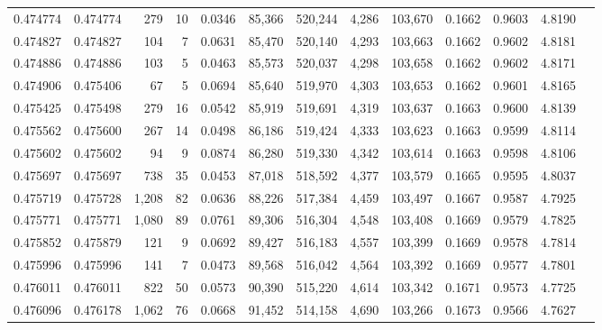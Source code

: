 \begin{tabular}{rrrrrrrrrrrrr}
0.474774 & 0.474774 &   279 &    10 &                                     0.0346 &  85,366 & 520,244 &   4,286 & 103,670 & 0.1662 & 0.9603 & 4.8190 \\
0.474827 & 0.474827 &   104 &     7 &                                     0.0631 &  85,470 & 520,140 &   4,293 & 103,663 & 0.1662 & 0.9602 & 4.8181 \\
0.474886 & 0.474886 &   103 &     5 &                                     0.0463 &  85,573 & 520,037 &   4,298 & 103,658 & 0.1662 & 0.9602 & 4.8171 \\
0.474906 & 0.475406 &    67 &     5 &                                     0.0694 &  85,640 & 519,970 &   4,303 & 103,653 & 0.1662 & 0.9601 & 4.8165 \\
0.475425 & 0.475498 &   279 &    16 &                                     0.0542 &  85,919 & 519,691 &   4,319 & 103,637 & 0.1663 & 0.9600 & 4.8139 \\
0.475562 & 0.475600 &   267 &    14 &                                     0.0498 &  86,186 & 519,424 &   4,333 & 103,623 & 0.1663 & 0.9599 & 4.8114 \\
0.475602 & 0.475602 &    94 &     9 &                                     0.0874 &  86,280 & 519,330 &   4,342 & 103,614 & 0.1663 & 0.9598 & 4.8106 \\
0.475697 & 0.475697 &   738 &    35 &                                     0.0453 &  87,018 & 518,592 &   4,377 & 103,579 & 0.1665 & 0.9595 & 4.8037 \\
0.475719 & 0.475728 & 1,208 &    82 &                                     0.0636 &  88,226 & 517,384 &   4,459 & 103,497 & 0.1667 & 0.9587 & 4.7925 \\
0.475771 & 0.475771 & 1,080 &    89 &                                     0.0761 &  89,306 & 516,304 &   4,548 & 103,408 & 0.1669 & 0.9579 & 4.7825 \\
0.475852 & 0.475879 &   121 &     9 &                                     0.0692 &  89,427 & 516,183 &   4,557 & 103,399 & 0.1669 & 0.9578 & 4.7814 \\
0.475996 & 0.475996 &   141 &     7 &                                     0.0473 &  89,568 & 516,042 &   4,564 & 103,392 & 0.1669 & 0.9577 & 4.7801 \\
0.476011 & 0.476011 &   822 &    50 &                                     0.0573 &  90,390 & 515,220 &   4,614 & 103,342 & 0.1671 & 0.9573 & 4.7725 \\
0.476096 & 0.476178 & 1,062 &    76 &                                     0.0668 &  91,452 & 514,158 &   4,690 & 103,266 & 0.1673 & 0.9566 & 4.7627 \\

\end{tabular}
